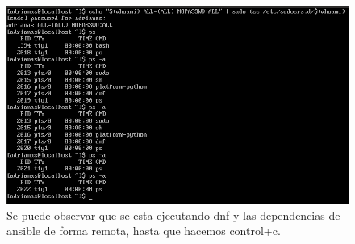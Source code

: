 \begin{figure}[H]
	\centering
	\includegraphics[scale=0.5]{graphics/img19.png}
	\caption{Se puede observar que se esta ejecutando dnf y las dependencias de ansible de forma remota, hasta que hacemos control+c.}
\end{figure}







